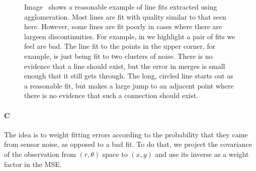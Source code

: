 \documentclass[12pt]{article}
\begin{document}
\begin{figure}[htb]
\centering
{}
\caption{Image~ shows a reasonable example of line fits
    extracted using agglomeration. Most lines are fit with quality similar to that
    seen here. However, some lines are fit poorly in cases where there are largeen
    discontinuities. For example, in  we highlight a pair
    of fits we feel are bad. The line fit to the points in the upper corner, for
    example, is just being fit to two clusters of noise. There is no evidence
    that a line should exist, but the error in merges is small enough that it
    still gets through. The long, circled line starts out as a reasonable fit, but
    makes a large jump to an adjacent point where there is no evidence that such a
    connection should exist.
}
\label{fig:line_fits}
\end{figure}

\paragraph{C}
The idea is to weight fitting errors according to the probability that they came from sensor noise, as opposed to a bad fit. To do that, we project the covariance of the observation from $(r,\theta)$ space to $(x,y)$ and use its inverse as a weight factor in the MSE.
\end{document}

